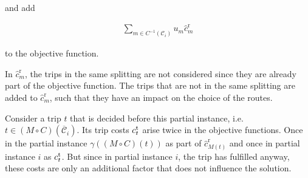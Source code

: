 and add 

\begin{align*}
	\sum_{m\in C^{-1}\left(\mathcal{C}_i\right)} u_m \hat{c}^{\operatorname{r}}_m
\end{align*}

to the objective function.

In $\hat{c}^{\operatorname{r}}_m$, the trips in the same splitting are not considered since they are already part of the objective function. The trips that are not in the same splitting are added to $\hat{c}^{\operatorname{r}}_m$, such that they have an impact on the choice of the routes.

Consider a trip $t$ that is decided before this partial instance, i.e. $t\in(M\circ C)\left(\overline{\mathcal{C}}_i\right)$. Its trip costs $c^{\operatorname{t}}_t$ arise twice in the objective functions. Once in the partial instance $\gamma\left((M\circ C)(t)\right)$ as part of $\hat{c}^{\operatorname{r}}_{M(t)}$ and once in partial instance $i$ as $c^{\operatorname{t}}_t$. But since in partial instance $i$, the trip has fulfilled anyway, these costs are only an additional factor that does not influence the solution.

